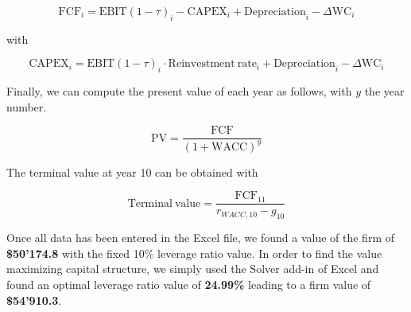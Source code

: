 \documentclass[a4paper,11pt,twoside]{article}
\def \be {\begin{equation}}
\def \ee {\end{equation}}
\begin{document}
\be
\mathrm{FCF}_i = \mathrm{EBIT}(1-\tau)_i - \mathrm{CAPEX}_i + \mathrm{Depreciation}_i - \Delta \mathrm{WC}_i
\ee

with  

\be
\mathrm{CAPEX}_i = \mathrm{EBIT}(1-\tau)_i \cdot \mathrm{Reinvestment\ rate}_i + \mathrm{Depreciation}_i  - \Delta \mathrm{WC}_i
\ee

Finally, we can compute the present value of each year as follows, with $y$ the year number.

\be
\mathrm{PV}=\frac{\mathrm{FCF}}{(1+\mathrm{WACC})^{y}}
\ee

The terminal value at year 10 can be obtained with

\be
\mathrm{Terminal\ value} = \frac{\mathrm{FCF}_{11}}{{r_{WACC,10}} - g_{10}}
\ee

Once all data has been entered in the Excel file, we found a value of the firm of \textbf{\$50'174.8} with the fixed 10\% leverage ratio value. In order to find the value maximizing capital structure, we simply used the Solver add-in of Excel and found an optimal leverage ratio value of \textbf{24.99\%} leading to a firm value of \textbf{\$54'910.3}. 







\end{document}
